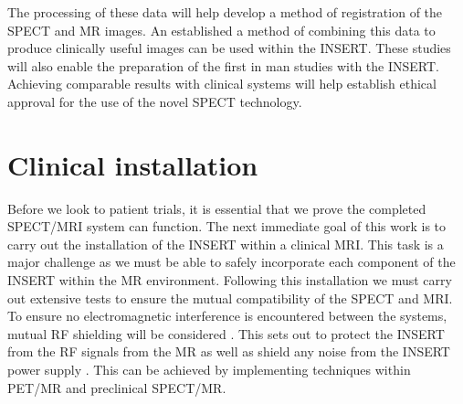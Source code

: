 The processing of these data will help develop a method of registration of the \acrshort{SPECT} and \acrshort{MR} images. An established a method of combining this data to produce clinically useful images can be used within the \acrshort{INSERT}. These studies will also enable the preparation of the first in man studies with the \acrshort{INSERT}. Achieving comparable results with clinical systems will help establish ethical approval for the use of the novel \acrshort{SPECT} technology. 

\section{Clinical installation}
Before we look to patient trials, it is essential that we prove the completed \acrshort{SPECT/MRI} system can function. The next immediate goal of this work is to carry out the installation of the \acrshort{INSERT} within a clinical \acrshort{MRI}. This task is a major challenge as we must be able to safely incorporate each component of the \acrshort{INSERT} within the \acrshort{MR} environment. Following this installation we must carry out extensive tests to ensure the mutual compatibility of the \acrshort{SPECT} and \acrshort{MRI}. To ensure no electromagnetic interference is encountered between the systems, mutual \acrshort{RF} shielding will be considered \cite{Lee2018LowApplications}. This sets out to protect the \acrshort{INSERT} from the \acrshort{RF} signals from the \acrshort{MR} as well as shield any noise from the \acrshort{INSERT} power supply \cite{Salvado2016ShieldingSystem}. This can be achieved by implementing techniques within \acrshort{PET/MR} \cite{Peng2014New7T} and preclinical \acrshort{SPECT/MR}.

